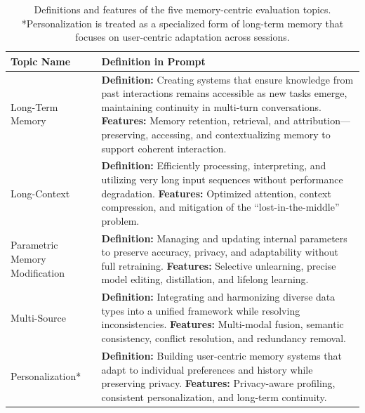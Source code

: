 \begin{table}[ht]
\centering
\small
\renewcommand{\arraystretch}{1.2}
\begin{tabular}{p{3.4cm}p{11.6cm}}
\toprule
\textbf{Topic Name} & \textbf{Definition in Prompt} \\
\midrule
Long-Term Memory &
\textbf{Definition:} Creating systems that ensure knowledge from past interactions remains accessible as new tasks emerge, maintaining continuity in multi-turn conversations. \newline
\textbf{Features:} Memory retention, retrieval, and attribution—preserving, accessing, and contextualizing memory to support coherent interaction. \\
\midrule
Long-Context &
\textbf{Definition:} Efficiently processing, interpreting, and utilizing very long input sequences without performance degradation. \newline
\textbf{Features:} Optimized attention, context compression, and mitigation of the “lost-in-the-middle” problem. \\
\midrule
Parametric Memory Modification &
\textbf{Definition:} Managing and updating internal parameters to preserve accuracy, privacy, and adaptability without full retraining. \newline
\textbf{Features:} Selective unlearning, precise model editing, distillation, and lifelong learning. \\
\midrule
Multi-Source&
\textbf{Definition:} Integrating and harmonizing diverse data types into a unified framework while resolving inconsistencies. \newline
\textbf{Features:} Multi-modal fusion, semantic consistency, conflict resolution, and redundancy removal. \\
\midrule
Personalization* &
\textbf{Definition:} Building user-centric memory systems that adapt to individual preferences and history while preserving privacy. \newline
\textbf{Features:} Privacy-aware profiling, consistent personalization, and long-term continuity. \\
\bottomrule
\end{tabular}
\caption{Definitions and features of the five memory-centric evaluation topics. *Personalization is treated as a specialized form of long-term memory that focuses on user-centric adaptation across sessions.}
\label{tab:task_definitions}
\end{table}

